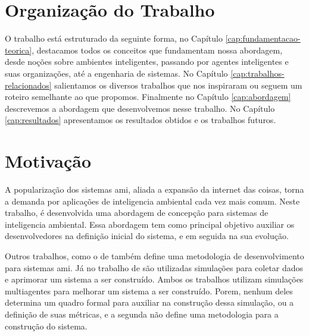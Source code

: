 \section{Organização do Trabalho}
    
O trabalho está estruturado da seguinte forma, no Capítulo \ref{cap:fundamentacao-teorica}, destacamos todos os conceitos que fundamentam nossa abordagem, desde noções sobre ambientes inteligentes, passando por agentes inteligentes e suas organizações, até a engenharia de sistemas. No Capítulo \ref{cap:trabalhos-relacionados} salientamos os diversos trabalhos que nos inspiraram ou seguem um roteiro semelhante ao que propomos. Finalmente no Capítulo \ref{cap:abordagem} descrevemos a abordagem que desenvolvemos nesse trabalho. No Capítulo \ref{cap:resultados} apresentamos os resultados obtidos e os trabalhos futuros. 
    
\section{Motivação}
\label{sec:motivacao}









A popularização dos sistemas \acrshort{ami}, aliada a expansão da internet das coisas, torna a demanda por aplicações de inteligencia ambiental cada vez mais comum. 
Neste trabalho, é desenvolvida uma abordagem de concepção para sistemas de inteligencia ambiental. Essa abordagem tem como principal objetivo auxiliar os desenvolvedores na definição inicial do sistema, e em seguida na sua evolução. 
 
Outros trabalhos, como o de  também define uma metodologia de desenvolvimento para sistemas \acrshort{ami}. Já no trabalho de  são utilizadas simulações para coletar dados e aprimorar um sistema a ser construído. Ambos os trabalhos utilizam simulações multiagentes para melhorar um sistema a ser construído. Porem, nenhum deles determina um quadro formal para auxiliar na construção dessa simulação, ou a definição de suas métricas, e a segunda não define uma metodologia para a construção do sistema. 

